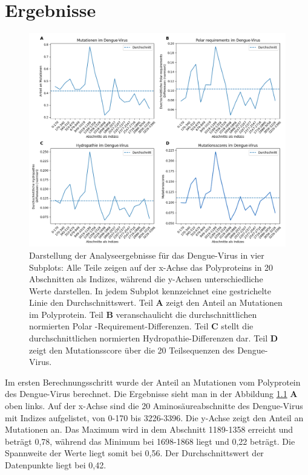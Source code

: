 \documentclass[german,version-2022-01]{uzl-thesis}
\begin{document}
\chapter{Ergebnisse}
\begin{figure}[tbp]
  \centering
  \includegraphics[scale=0.36]{Images/Diagramm_combined_pictures_Dengue_virus.png}
  \caption{Darstellung der Analyseergebnisse f\"ur das Dengue-Virus in vier Subplots: Alle Teile zeigen auf der x-Achse das Polyproteins in 20 Abschnitten als Indizes, w\"ahrend die y-Achsen unterschiedliche Werte darstellen. In jedem Subplot kennzeichnet eine gestrichelte Linie den Durchschnittswert. Teil \textbf{A} zeigt den Anteil an Mutationen im Polyprotein. Teil \textbf{B} veranschaulicht die durchschnittlichen normierten Polar
  -Requirement-Differenzen. Teil \textbf{C} stellt die durchschnittlichen normierten Hydropathie-Differenzen dar. Teil \textbf{D} zeigt den Mutationsscore \"uber die 20 Teilsequenzen des Dengue-Virus.}
  \label{fig:Dengue_virus_combined}
\end{figure}

Im ersten Berechnungsschritt wurde der Anteil an Mutationen vom Polyprotein des Dengue-Virus berechnet. Die Ergebnisse sieht man in der Abbildung \ref{fig:Dengue_virus_combined} \textbf{A} oben links. Auf der x-Achse sind die 20 Aminos\"aureabschnitte des Dengue-Virus mit Indizes aufgelistet, von 0-170 bis 3226-3396. Die y-Achse zeigt den Anteil an Mutationen an. Das Maximum wird in dem Abschnitt 1189-1358 erreicht und betr\"agt 0,78, w\"ahrend das Minimum bei 1698-1868 liegt und 0,22 betr\"agt. Die Spannweite der Werte liegt somit bei 0,56. Der Durchschnittswert der Datenpunkte liegt bei 0,42. 
\end{document}
